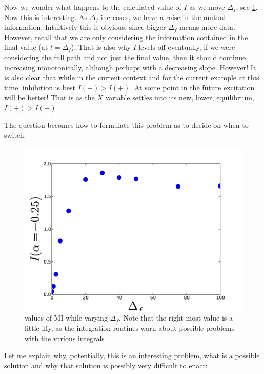 Now we wonder what happens to the calculated value of $I$ as we move $\Delta_f$,
see \cref{fig:MI_delta_f_variation}. Now this is interesting. As $\Delta_f$
increases, we have a raise in the mutual information. Intuitively this is
obvious, since bigger $\Delta_f$ means more data. However, recall that we are
only considering the information contained in the final value (at $t=\Delta_f$).
That is also why $I$ levels off eventually, if we were considering the full path
and not just the final value, then it should continue increasing monotonically,
although perhaps with a decreasing slope. However! It is also clear that while
in the current context and for the current example at this time, inhibition is
best $I(-) > I(+)$. At some point in the future excitation will be better! That
is as the $X$ variable settles into its new, lower, equilibrium, $I(+) > I(-)$.

The question becomes how to formulate this problem as to decide on when to
switch. 
\begin{figure}[htp]
\begin{center}
  \includegraphics[width=1\textwidth]{Figs/MI/forward_deltas_vs_MIs.pdf}
\caption{values of MI while varying $\Delta_f$. Note that the right-most value
is a little iffy, as the integration routines warn about possible problems with
the various integrals}
	\label{fig:MI_delta_f_variation}
\end{center}
\end{figure} 
Let me explain why, potentially, this is an interesting problem, what is a
possible solution and why that solution is possibly very difficult to enact:

